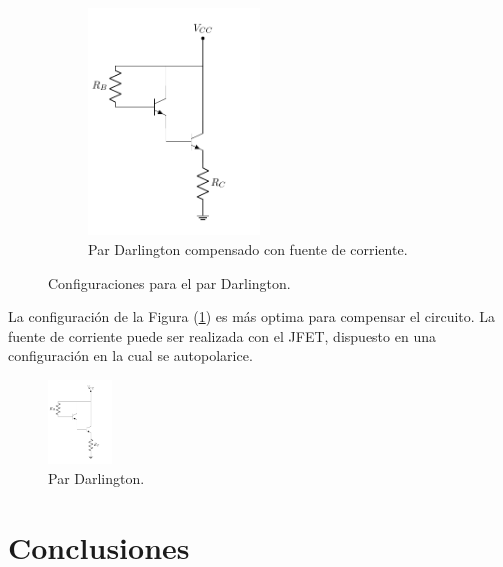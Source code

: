 \begin{figure}[H]
\begin{subfigure}{.5\textwidth}
\centering
	\includegraphics[width=0.5\textwidth, page=3]{Imagenes/ParDarlington.pdf}
	\caption{Par Darlington compensado con fuente de corriente.}
	\label{fig:pardar3}
\end{subfigure}
\caption{Configuraciones para el par Darlington.}
\label{fig:pardar}
\end{figure}

La configuración de la Figura (\ref{fig:pardar3}) es más optima para compensar el circuito. La fuente de corriente puede ser realizada con el JFET, dispuesto en una configuración en la cual se autopolarice.
\begin{figure}[H]
\centering
	\includegraphics[width=0.15\textwidth, page=4]{Imagenes/ParDarlington.pdf}
	\caption{Par Darlington.}
	\label{fig:fuentei}
\end{figure}


\section{Conclusiones}
	
